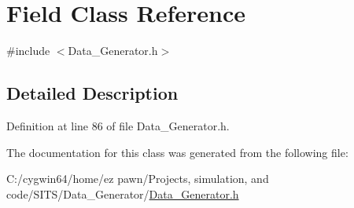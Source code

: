 \hypertarget{class_field}{}\section{Field Class Reference}
\label{class_field}


{\ttfamily \#include $<$Data\+\_\+\+Generator.\+h$>$}



\subsection{Detailed Description}


Definition at line 86 of file Data\+\_\+\+Generator.\+h.



The documentation for this class was generated from the following file\+:\begin{DoxyCompactItemize}
\item 
C\+:/cygwin64/home/ez pawn/\+Projects, simulation, and code/\+S\+I\+T\+S/\+Data\+\_\+\+Generator/\hyperlink{_data___generator_8h}{Data\+\_\+\+Generator.\+h}\end{DoxyCompactItemize}
